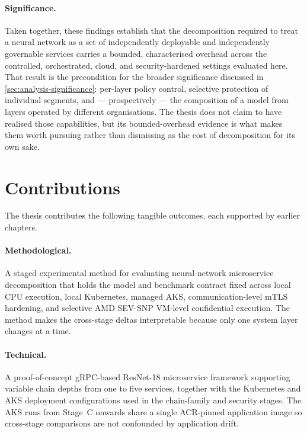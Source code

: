 \paragraph{Significance.} Taken together, these findings establish that the
decomposition required to treat a neural network as a set of independently
deployable and independently governable services carries a bounded, characterised
overhead across the controlled, orchestrated, cloud, and security-hardened settings
evaluated here.
That result is the precondition for the broader significance discussed in
\cref{sec:analysis-significance}: per-layer policy control, selective protection of
individual segments, and --- prospectively --- the composition of a model from
layers operated by different organisations. The thesis does not claim to have
realised those capabilities, but its bounded-overhead evidence is what makes them
worth pursuing rather than dismissing as the cost of decomposition for its own
sake.

\section{Contributions}
\label{sec:conclusion-contributions}

The thesis contributes the following tangible outcomes, each
supported by earlier chapters.

\paragraph{Methodological.} A staged experimental method for
evaluating neural-network microservice decomposition that holds the
model and benchmark contract fixed across local CPU execution, local
Kubernetes, managed AKS, communication-level mTLS hardening, and
selective AMD SEV-SNP VM-level confidential execution. The method
makes the cross-stage deltas interpretable because only one system
layer changes at a time.

\paragraph{Technical.} A proof-of-concept gRPC-based ResNet-18
microservice framework supporting variable chain depths from one to
five services, together with the Kubernetes and AKS deployment
configurations used in the chain-family and security stages. The
AKS runs from Stage~C onwards share a single ACR-pinned application
image so cross-stage comparisons are not confounded by application
drift.


